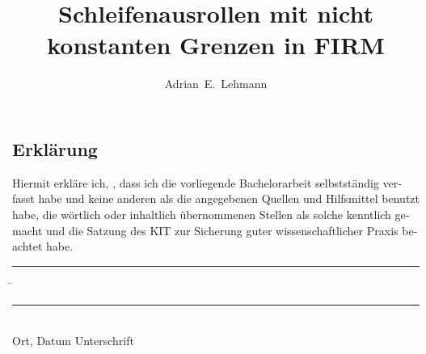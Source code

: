\documentclass[parskip=no,12pt,a4paper,twoside,headings=openright]{scrreprt}
\title{Schleifenausrollen mit nicht konstanten Grenzen in FIRM}
\author{Adrian~E.~Lehmann}
\begin{document}

\begin{otherlanguage}{ngerman} %
\mytitlepage
\end{otherlanguage}



\tableofcontents










\begin{otherlanguage}{ngerman}
\chapter*{Erklärung}
\pagestyle{empty}

  \vspace{20mm}
  Hiermit erkläre ich, \theauthor, dass ich die vorliegende Bachelorarbeit selbst\-ständig
verfasst habe und keine anderen als die angegebenen Quellen und Hilfsmittel
benutzt habe, die wörtlich oder inhaltlich übernommenen Stellen als solche kenntlich gemacht und
die Satzung des KIT zur Sicherung guter wissenschaftlicher Praxis beachtet habe.
  \vspace{20mm}
  \begin{tabbing}
  \rule{4cm}{.4pt}\hspace{1cm} \= \rule{7cm}{.4pt} \\
 Ort, Datum \> Unterschrift
  \end{tabbing}
\end{otherlanguage}


\pagestyle{fancy}
\appendix


\end{document}
